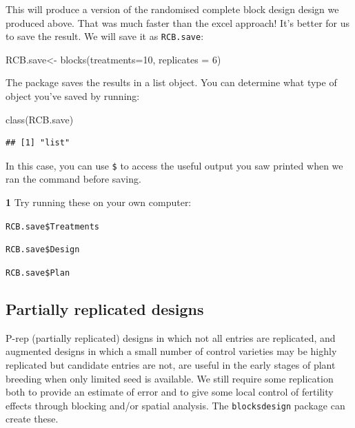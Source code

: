 \documentclass[
]{book}
\makeatletter
\newenvironment{Shaded}{\begin{snugshade}}{\end{snugshade}}
\newcommand{\AttributeTok}[1]{\textcolor[rgb]{0.77,0.63,0.00}{#1}}
\newcommand{\DecValTok}[1]{\textcolor[rgb]{0.00,0.00,0.81}{#1}}
\newcommand{\FunctionTok}[1]{\textcolor[rgb]{0.00,0.00,0.00}{#1}}
\newcommand{\NormalTok}[1]{#1}
\newcommand{\OtherTok}[1]{\textcolor[rgb]{0.56,0.35,0.01}{#1}}
\newenvironment{kframe}{%
\medskip{}
\setlength{\fboxsep}{.8em}
 \def\at@end@of@kframe{}%
 \ifinner\ifhmode%
  \def\at@end@of@kframe{\end{minipage}}%
  \begin{minipage}{\columnwidth}%
 \fi\fi%
 \def\FrameCommand##1{\hskip\@totalleftmargin \hskip-\fboxsep
 \colorbox{shadecolor}{##1}\hskip-\fboxsep
     \hskip-\linewidth \hskip-\@totalleftmargin \hskip\columnwidth}%
 \MakeFramed {\advance\hsize-\width
   \@totalleftmargin\z@ \linewidth\hsize
   \@setminipage}}%
 {\par\unskip\endMakeFramed%
 \at@end@of@kframe}
\newenvironment{rmdblock}[1]
  {
  \begin{itemize}
  \renewcommand{\labelitemi}{
    \raisebox{-.7\height}[0pt][0pt]{
      {\setkeys{Gin}{width=3em,keepaspectratio}\texttt{[image: images/\#1]}}
    }
  }
  \setlength{\fboxsep}{1em}
  \begin{kframe}
  \item
  }
  {
  \end{kframe}
  \end{itemize}
  }
\newenvironment{rmdquiz}
  {\begin{rmdblock}{quiz}}
  {\end{rmdblock}}
\makeatother
\begin{document}
This will produce a version of the randomised complete block design design we produced above. That was much faster than the excel approach! It's better for us to save the result. We will save it as \texttt{RCB.save}:

\begin{Shaded}
\begin{Highlighting}[]
\NormalTok{RCB.save}\OtherTok{\textless{}{-}} \FunctionTok{blocks}\NormalTok{(}\AttributeTok{treatments=}\DecValTok{10}\NormalTok{, }\AttributeTok{replicates =} \DecValTok{6}\NormalTok{)}
\end{Highlighting}
\end{Shaded}

The package saves the results in a list object. You can determine what type of object you've saved by running:

\begin{Shaded}
\begin{Highlighting}[]
\FunctionTok{class}\NormalTok{(RCB.save)}
\end{Highlighting}
\end{Shaded}

\begin{verbatim}
## [1] "list"
\end{verbatim}

In this case, you can use \texttt{\$} to access the useful output you saw printed when we ran the command before saving.

\begin{rmdquiz}
\textbf{1} Try running these on your own computer:

\texttt{RCB.save\$Treatments}

\texttt{RCB.save\$Design}

\texttt{RCB.save\$Plan}
\end{rmdquiz}

\hypertarget{partially-replicated-designs}{%
\subsection{Partially replicated designs}\label{partially-replicated-designs}}

P-rep (partially replicated) designs in which not all entries are replicated, and augmented designs in which a small number of control varieties may be highly replicated but candidate entries are not, are useful in the early stages of plant breeding when only limited seed is available. We still require some replication both to provide an estimate of error and to give some local control of fertility effects through blocking and/or spatial analysis. The \texttt{blocksdesign} package can create these.
\end{document}
